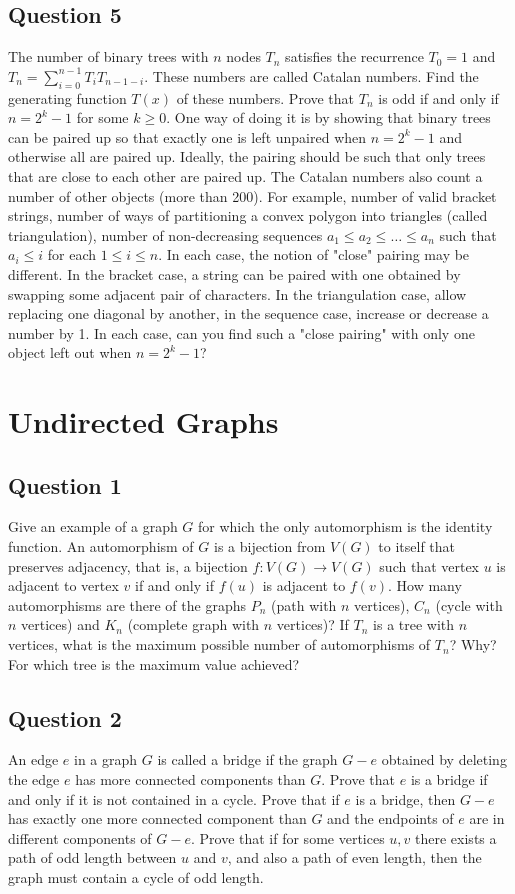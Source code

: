 \documentclass[12pt]{report}
\begin{document}
\section*{Question 5}
The number of binary trees with $n$ nodes $T_{n}$ satisfies the recurrence $T_{0} = 1$ and $T_{n} = \sum\limits_{i = 0}^{n - 1}T_{i}T_{n - 1 - i}$. These numbers are called Catalan numbers. Find the generating function $T(x)$ of these numbers. Prove that $T_{n}$ is odd if and only if $n = 2^{k} - 1$ for some $k \geq 0$.  One way of doing it is by showing that binary trees can be paired up so that exactly one is left unpaired when $n = 2^{k} - 1$ and otherwise all are paired up.  Ideally, the pairing should be such that only trees that are close to each other are paired up. The Catalan numbers also count a number of other objects (more than 200). For example, number of valid bracket strings, number of ways of partitioning a convex polygon into triangles (called triangulation), number of non-decreasing sequences $a_{1} \leq a_{2} \leq \dots \leq a_{n}$ such that $a_{i} \leq i$ for each $1 \leq i \leq n$. In each case, the notion of "close" pairing may be different. In the bracket case, a string can be paired with one obtained by swapping some adjacent pair of characters. In the triangulation case, allow replacing one diagonal by another, in the sequence case, increase or decrease a number by 1. In each case, can you find such a "close pairing" with only one object left out when $n = 2^{k} - 1$?
\chapter{Undirected Graphs}
\section*{Question 1}
Give an example of a graph $G$ for which the only automorphism is the identity function. An automorphism of $G$ is a bijection from $V(G)$ to itself that preserves adjacency, that is, a bijection $f: V(G) \rightarrow V(G)$ such that vertex $u$ is adjacent to vertex $v$ if and only if $f(u)$ is adjacent to $f(v)$. How many automorphisms are there of the graphs $P_{n}$ (path with $n$ vertices), $C_{n}$ (cycle with $n$ vertices) and $K_{n}$ (complete graph with $n$ vertices)? If $T_{n}$ is a tree with $n$ vertices, what is the maximum possible number of automorphisms of $T_{n}$? Why? For which tree is the maximum value achieved?
\section*{Question 2}
An edge $e$ in a graph $G$ is called a bridge if the graph $G - e$ obtained by deleting the edge $e$ has more connected components than $G$. Prove that $e$ is a bridge if and only if it is not contained in a cycle. Prove that if $e$ is a bridge, then $G - e$ has exactly one more connected component than $G$ and the endpoints of $e$ are in different components of $G - e$. Prove that if for some vertices $u, v$ there exists a path of odd length between $u$ and $v$, and also a path of even length, then the graph must contain a cycle of odd length.
\end{document}
